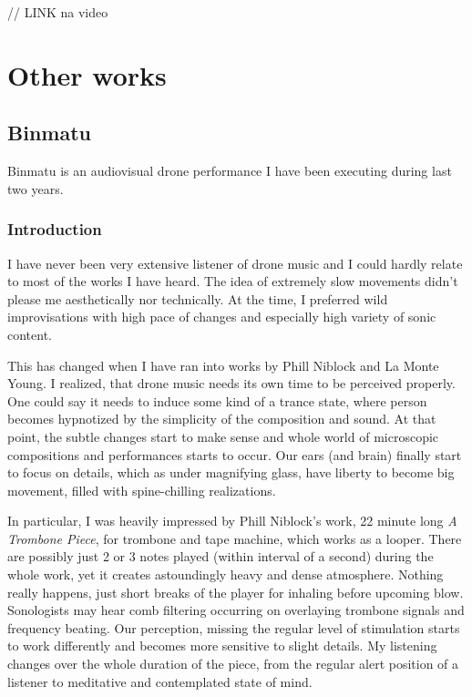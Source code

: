 \documentclass[12pt,a4paper,oneside]{report}
\begin{document}
// LINK na video
\chapter{Other works} 
\section{Binmatu} Binmatu is an audiovisual drone performance I have been executing during last two years.

\subsection{Introduction} I have never been very extensive listener of drone music and I could hardly relate to most of the works I have heard. The idea of extremely slow movements didn't please me aesthetically nor technically. At the time, I preferred wild improvisations with high pace of changes and especially high variety of sonic content.

This has changed when I have ran into works by Phill Niblock and La Monte Young. I realized, that drone music needs its own time to be perceived properly. One could say it needs to induce some kind of a trance state, where person becomes hypnotized by the simplicity of the composition and sound. At that point, the subtle changes start to make sense and whole world of microscopic compositions and performances starts to occur. Our ears (and brain) finally start to focus on details, which as under magnifying glass, have liberty to become big movement, filled with spine-chilling realizations.

In particular, I was heavily impressed by Phill Niblock's work, 22 minute long \emph{A Trombone Piece}, for trombone and tape machine, which works as a looper. There are possibly just 2 or 3 notes played (within interval of a second) during the whole work, yet it creates astoundingly heavy and dense atmosphere. Nothing really happens, just short breaks of the player for inhaling before upcoming blow. Sonologists may hear comb filtering occurring on overlaying trombone signals and frequency beating. Our perception, missing the regular level of stimulation starts to work differently and becomes more sensitive to slight details. My listening changes over the whole duration of the piece, from the regular alert position of a listener to meditative and contemplated state of mind. 
\end{document}
